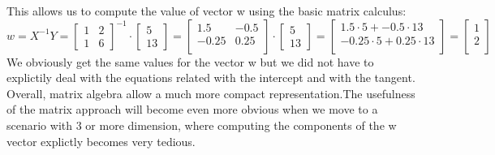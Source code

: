 This allows us to compute the value of vector w using the basic matrix calculus:
\begin{equation}
w = X^{-1} Y = \begin{bmatrix}
1 & 2 \\
1 & 6
\end{bmatrix}^{-1}
\cdot
\begin{bmatrix}
5 \\ 
13
\end{bmatrix}
= 
\begin{bmatrix}
1.5 & -0.5\\
-0.25 & 0.25\\
\end{bmatrix}
\cdot
\begin{bmatrix}
5 \\ 
13
\end{bmatrix}
= 
\begin{bmatrix}
1.5 \cdot 5 + -0.5 \cdot 13\\
-0.25 \cdot 5 + 0.25 \cdot 13\\
\end{bmatrix}
\label{slope_equation}
= 
\begin{bmatrix}
1\\
2\\
\end{bmatrix}
\end{equation}
We obviously get the same values for the vector w but we did not have to explictily deal with the equations related with the intercept and with the tangent. Overall, matrix algebra allow a much more compact representation.The usefulness of the matrix approach will become even more obvious when we move to a scenario with 3 or more dimension, where computing the components of the w vector explictly becomes very tedious.


